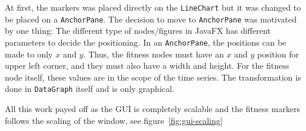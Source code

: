 At first, the markers was placed directly on the \texttt{LineChart} but it
was changed to be placed on a \texttt{AnchorPane}. The decision to move to
\texttt{AnchorPane} was motivated by one thing: The different type of
nodes/figures in JavaFX has different parameters to decide the positioning. In
an \texttt{AnchorPane}, the positions can be made to only $x$ and $y$. Thus, the
fitness nodes must have an $x$ and $y$ position for upper left corner, and they
must also have a width and height. For the fitness node itself, these values are
in the scope of the time series. The transformation is done in
\texttt{DataGraph} itself
and is only graphical. 

All this work payed off as the GUI is completely scalable and the fitness
markers follows the scaling of the window, see figure~\ref{fig:gui-scaling}

